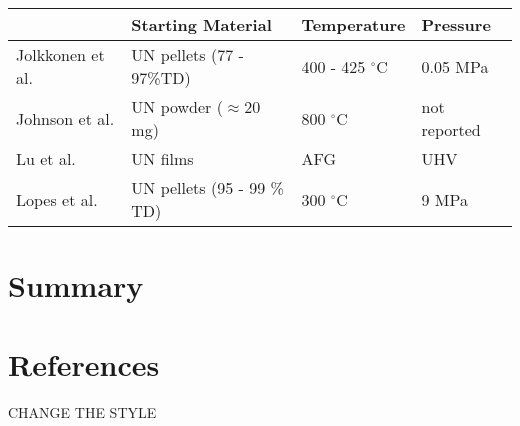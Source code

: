 \documentclass[3p,review,11pt]{elsarticle}
\begin{document}
\begin{tabular}{ |p{3cm}|p{3cm}|p{3cm}|p{3cm}|  }
	\hline
	 & Starting Material &Temperature & Pressure\\
	\hline
	Jolkkonen et al. \cite{Jolkkonen2017}   &  UN pellets (77 - 97\%TD) &400 - 425 $^{\circ}$C&  0.05 MPa \\
	Johnson et al. \cite{Johnson2016}   & UN powder ($\approx$20 mg)     &800 $^{\circ}$C&  not reported \\
	Lu et al. \cite{Lu2016}  & UN films    &AFG&   UHV \\
	Lopes et al. \cite{Lopes2017}   & UN pellets (95 - 99 \% TD)    & 300 $^{\circ}$C&   9 MPa \\
	\hline
\end{tabular}
\section{Summary}











\section*{References}
CHANGE THE STYLE



\end{document}
